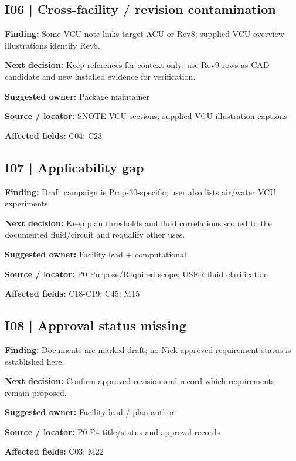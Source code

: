 \documentclass[11pt]{article}
\begin{document}
\par\noindent\begin{minipage}{\textwidth}\small\setlength{\parskip}{2pt}
\subsection*{I06 | Cross-facility / revision contamination}
\textbf{Finding:} Some VCU note links target ACU or Rev8; supplied VCU overview illustrations identify Rev8.\par
\textbf{Next decision:} Keep references for context only; use Rev9 rows as CAD candidate and new installed evidence for verification.\par
\textbf{Suggested owner:} Package maintainer\par
\textbf{Source / locator:} SNOTE VCU sections; supplied VCU illustration captions\par
\textbf{Affected fields:} C04; C23\par
\end{minipage}\par\vspace{8pt}
\par\noindent\begin{minipage}{\textwidth}\small\setlength{\parskip}{2pt}
\subsection*{I07 | Applicability gap}
\textbf{Finding:} Draft campaign is Prop-30-specific; user also lists air/water VCU experiments.\par
\textbf{Next decision:} Keep plan thresholds and fluid correlations scoped to the documented fluid/circuit and requalify other uses.\par
\textbf{Suggested owner:} Facility lead + computational\par
\textbf{Source / locator:} P0 Purpose/Required scope; USER fluid clarification\par
\textbf{Affected fields:} C18-C19; C45; M15\par
\end{minipage}\par\vspace{8pt}
\par\noindent\begin{minipage}{\textwidth}\small\setlength{\parskip}{2pt}
\subsection*{I08 | Approval status missing}
\textbf{Finding:} Documents are marked draft; no Nick-approved requirement status is established here.\par
\textbf{Next decision:} Confirm approved revision and record which requirements remain proposed.\par
\textbf{Suggested owner:} Facility lead / plan author\par
\textbf{Source / locator:} P0-P4 title/status and approval records\par
\textbf{Affected fields:} C03; M22\par
\end{minipage}\par\vspace{8pt}
\end{document}
